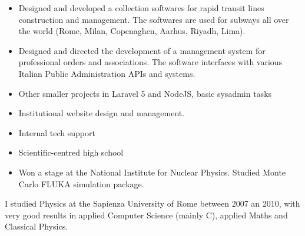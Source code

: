 \documentclass[10pt,a4paper]{altacv}
\begin{document}

\begin{fullwidth}
\makecvheader
\end{fullwidth}


\begin{itemize}
\item Designed and developed a collection softwares for rapid transit lines construction and management. The softwares are used for subways all over the world (Rome, Milan, Copenaghen, Aarhus, Riyadh, Lima).
\item Designed and directed the development of a management system for professional orders and associations. The software interfaces with various Italian Public Administration APIs and systems.
\item Other smaller projects in Laravel 5 and NodeJS, basic sysadmin tasks
\end{itemize}

\divider

\begin{itemize}
\item Institutional website design and management.
\item Internal tech support
\end{itemize}


\begin{itemize}
\item Scientific-centred high school
\item Won a stage at the National Institute for Nuclear Physics. Studied Monte Carlo FLUKA simulation package.
\end{itemize}

I studied Physics at the Sapienza University of Rome between 2007 an 2010, with very good results in applied Computer Science (mainly C), applied Maths and Classical Physics.
\end{document}
